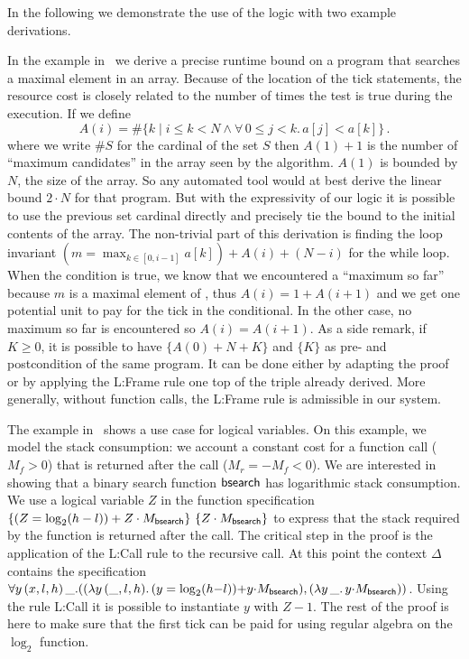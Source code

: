 \documentclass[nocopyrightspace,preprint,pldi]{sigplanconf-pldi15}
\newcommand{\pref}[1]{\prettyref{#1}}
\begin{document}
{In the following we demonstrate the use of the logic with two example
derivations.

In the example in~\pref{fig:xmplmax} we derive a precise runtime
bound on a program that searches a maximal element in an array.
Because of the location of the tick statements, the resource cost
is closely related to the number of times the test 
is true during the execution.
%
If we define
$$
 A(i) =  \# \{ k \mid i \le k < N \land \forall\, 0 \le j < k.\, a[j] < a[k] \} \, .
$$
where we write $\# S$ for the cardinal of the set $S$ then $A(1)+1$ is
the number of ``maximum candidates'' in the array  seen
by the algorithm. $A(1)$ is bounded by $N$, the size of the array.
So any automated tool would at best derive the linear bound $2 \cdot
N$ for that program.  But with the expressivity of our logic it is
possible to use the previous set cardinal directly and precisely tie
the bound to the initial contents of the array.
%
The non-trivial part of this derivation is finding the loop invariant
$(m = \max_{k \in [0, i-1]} a[k]) + A(i) + (N-i)$ for the while loop.
When the condition  is true, we know that we
encountered a ``maximum so far'' because $m$ is a maximal element of
, thus $A(i) = 1 + A(i+1)$ and we get one
potential unit to pay for the tick in the conditional.  In the other case, no
maximum so far is encountered so $A(i) = A(i+1)$.
As a side remark, if $K \ge 0$, it is possible to
have $\{ A(0) + N + K \}$ and $\{ K \}$ as pre- and postcondition
of the same program.  It can be done either by adapting the proof or by
applying the {\sc L:Frame} rule one top of the triple already derived.
More generally, without function calls, the {\sc L:Frame}
rule is admissible in our system.

The example in~\pref{fig:xmplbs} shows a use case for logical
variables. On this example, we model the stack consumption:
we account a constant cost for a function call ($M_f>0$) that
is returned after the call ($M_r = -M_f <0$).
We are interested in showing that a binary search function
$\mathsf{bsearch}$ has logarithmic stack consumption.  We use a logical
variable $Z$ in the function specification $\{(Z = \log_2(h-l))
  + Z \cdot M_{\mathsf{bsearch}}\}\, \, \{Z \cdot M_{\mathsf{bsearch}}\}$ to express that the stack required by the
function is returned after the call.
%
The critical step in the proof is the application of the
{\sc L:Call} rule to the recursive call.  At this point
the context $\Delta$ contains the specification
$
  \forall y \, (x,l,h) \, \_.
  ( (\lambda y \, (\_, l, h) .\, (y = \log_2(h {-} l)) {+} y {\cdot} M_{\mathsf{bsearch}})
  , (\lambda y \, \_ .\, y {\cdot} M_{\mathsf{bsearch}})
  )
$.
%
Using the rule {\sc L:Call} it is possible to instantiate $y$ with $Z
- 1$.  The rest of the proof is here to make sure that the first tick
can be paid for using regular algebra on the $\log_2$ function.



}
\end{document}
